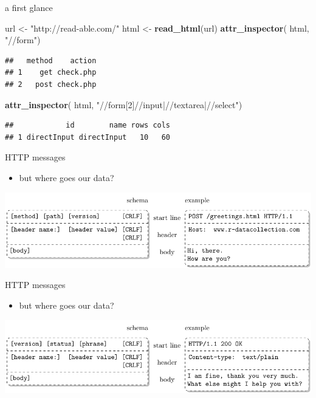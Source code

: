 \documentclass[ignorenonframetext,]{beamer}
\newenvironment{Shaded}{\begin{snugshade}}{\end{snugshade}}
\newcommand{\KeywordTok}[1]{\textcolor[rgb]{0.13,0.29,0.53}{\textbf{{#1}}}}
\newcommand{\StringTok}[1]{\textcolor[rgb]{0.31,0.60,0.02}{{#1}}}
\newcommand{\NormalTok}[1]{{#1}}
\providecommand{\tightlist}{%
  \setlength{\itemsep}{0pt}\setlength{\parskip}{0pt}}
\begin{document}
\begin{frame}[fragile]{a first glance}

\begin{Shaded}
\begin{Highlighting}[]
\NormalTok{url  <-}\StringTok{ "http://read-able.com/"}
\NormalTok{html <-}\StringTok{ }\KeywordTok{read_html}\NormalTok{(url)}
\KeywordTok{attr_inspector}\NormalTok{( html, }\StringTok{"//form"}\NormalTok{)}
\end{Highlighting}
\end{Shaded}

\begin{verbatim}
##   method    action
## 1    get check.php
## 2   post check.php
\end{verbatim}

\begin{Shaded}
\begin{Highlighting}[]
\KeywordTok{attr_inspector}\NormalTok{( html, }\StringTok{"//form[2]//input|//textarea|//select"}\NormalTok{)}
\end{Highlighting}
\end{Shaded}

\begin{verbatim}
##            id        name rows cols
## 1 directInput directInput   10   60
\end{verbatim}

\end{frame}

\begin{frame}{HTTP messages}

\begin{itemize}
\tightlist
\item
  but where goes our data?
\end{itemize}

\includegraphics{fig/httprequest.pdf}

\end{frame}

\begin{frame}{HTTP messages}

\begin{itemize}
\tightlist
\item
  but where goes our data?
\end{itemize}

\includegraphics{fig/httpresponse.pdf}

\end{frame}
\end{document}
